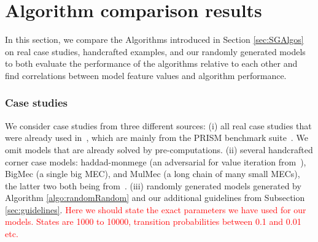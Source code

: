 \section{Algorithm comparison results}

In this section, we compare the Algorithms introduced in Section \ref{sec:SGAlgos} on real case studies, handcrafted examples, and our randomly generated models to both evaluate the 
performance of the algorithms relative to each other and find correlations between model feature values and algorithm performance.

\subsubsection*{Case studies}
We consider case studies from three different sources: 
(i) all real case studies that were already used in~\cite{gandalf20}, which are mainly from the PRISM benchmark suite~\cite{PRISMben}. We omit models that are already solved by pre-computations.
(ii) several handcrafted corner case models: haddad-monmege (an adversarial for value iteration from~\cite{haddadmonmege}), BigMec (a single big MEC), and MulMec (a long chain of many small MECs), the latter two both being from~\cite{gandalf}.
(iii) randomly generated models generated by Algorithm \ref{algo:randomRandom} and our additional guidelines from Subsection \ref{sec:guidelines}.
\textcolor{red}{Here we should state the exact parameters we have used for our models. States are 1000 to 10000, transition probabilities between 0.1 and 0.01 etc.}

